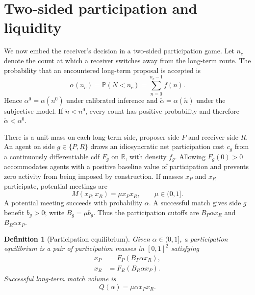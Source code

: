 \documentclass[11pt]{article}
\newtheorem{definition}{Definition}
\newcommand{\Prob}{\mathbb{P}}
\begin{document}
\section{Two-sided participation and liquidity}\label{sec:participation}

We now embed the receiver's decision in a two-sided participation game. Let
$n_c$ denote the count at which a receiver switches away from the long-term
route. The probability that an encountered long-term proposal is accepted is
\begin{equation}
\alpha(n_c)=\Prob(N<n_c)
=\sum_{n=0}^{n_c-1}f(n). \label{eq:acceptance-rate}
\end{equation}
Hence $\alpha^0=\alpha(n^0)$ under calibrated inference and
$\widetilde\alpha=\alpha(\widetilde n)$ under the subjective model. If
$\widetilde n<n^0$, every count has positive probability and therefore
$\widetilde\alpha<\alpha^0$.

There is a unit mass on each long-term side, proposer side $P$ and receiver side
$R$. An agent on side $g\in\{P,R\}$ draws an idiosyncratic net participation
cost $c_g$ from a continuously differentiable cdf $F_g$ on $\mathbb R$, with
density $f_g$. Allowing $F_g(0)>0$ accommodates agents with a positive baseline
value of participation and prevents zero activity from being imposed by
construction. If masses $x_P$ and $x_R$ participate, potential meetings are
\begin{equation}
M(x_P,x_R)=\mu x_Px_R,\qquad \mu\in(0,1]. \label{eq:matching-tech}
\end{equation}
A potential meeting succeeds with probability $\alpha$. A successful match
gives side $g$ benefit $b_g>0$; write $B_g=\mu b_g$. Thus the participation
cutoffs are $B_P\alpha x_R$ and $B_R\alpha x_P$.

\begin{definition}[Participation equilibrium]\label{def:participation}
Given $\alpha\in(0,1]$, a participation equilibrium is a pair of participation
masses in $[0,1]^2$ satisfying
\begin{align}
x_P&=F_P(B_P\alpha x_R), \label{eq:br-p}\\
x_R&=F_R(B_R\alpha x_P). \label{eq:br-r}
\end{align}
Successful long-term match volume is
\begin{equation}
Q(\alpha)=\mu\alpha x_Px_R. \label{eq:two-sided-volume}
\end{equation}
\end{definition}
\end{document}
